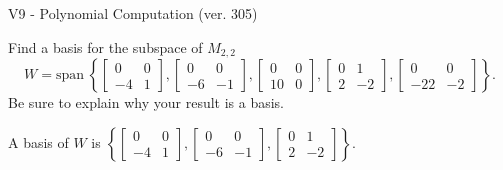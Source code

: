\begin{exercise}
  \begin{exerciseTitle}V9 - Polynomial Computation (ver. 305)\end{exerciseTitle}
  \begin{exerciseStatement}
    Find a basis for the subspace of \(M_{2,2}\) 
\[W=\mathrm{span}\ \left\{\left[\begin{array}{cc}
0 & 0 \\
-4 & 1
\end{array}\right] , \left[\begin{array}{cc}
0 & 0 \\
-6 & -1
\end{array}\right] , \left[\begin{array}{cc}
0 & 0 \\
10 & 0
\end{array}\right] , \left[\begin{array}{cc}
0 & 1 \\
2 & -2
\end{array}\right] , \left[\begin{array}{cc}
0 & 0 \\
-22 & -2
\end{array}\right]\right\}.\]
 Be sure to explain why your result is a basis.


  \end{exerciseStatement}
  \begin{exerciseAnswer}
   A basis of \(W\) is  \(\left\{\left[\begin{array}{cc}
0 & 0 \\
-4 & 1
\end{array}\right] , \left[\begin{array}{cc}
0 & 0 \\
-6 & -1
\end{array}\right] , \left[\begin{array}{cc}
0 & 1 \\
2 & -2
\end{array}\right]\right\}\).
  


  \end{exerciseAnswer}
\end{exercise}